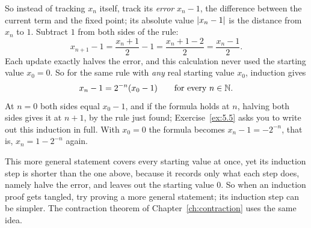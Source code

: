 So instead of tracking $x_n$ itself, track its \emph{error} $x_n-1$, the difference between the current term and the fixed point; its absolute value $\left|x_n-1\right|$ is the distance from $x_n$ to $1$. Subtract $1$ from both sides of the rule:
\[
x_{n+1}-1=\frac{x_n+1}{2}-1=\frac{x_n+1-2}{2}=\frac{x_n-1}{2}.
\]
Each update exactly halves the error, and this calculation never used the starting value $x_0=0$. So for the same rule with \emph{any} real starting value $x_0$, induction gives
\[
x_n-1=2^{-n}(x_0-1)\qquad\text{for every } n\in\mathbb N.
\]
At $n=0$ both sides equal $x_0-1$, and if the formula holds at $n$, halving both sides gives it at $n+1$, by the rule just found; Exercise~\ref{ex:5.5} asks you to write out this induction in full. With $x_0=0$ the formula becomes $x_n-1=-2^{-n}$, that is, $x_n=1-2^{-n}$ again.

This more general statement covers every starting value at once, yet its induction step is shorter than the one above, because it records only what each step does, namely halve the error, and leaves out the starting value $0$. So when an induction proof gets tangled, try proving a more general statement; its induction step can be simpler. The contraction theorem of Chapter~\ref{ch:contraction} uses the same idea.
